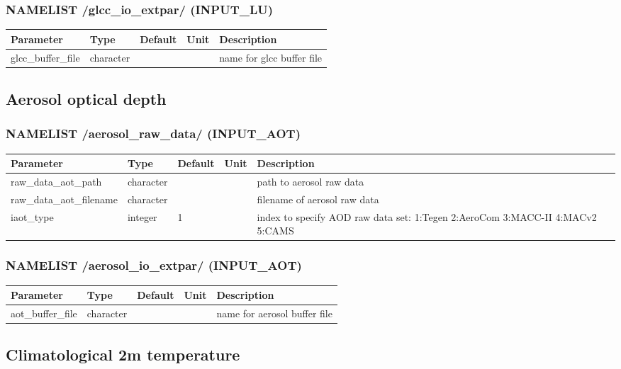 \documentclass[a4paper,10pt,DIV14,BCOR1cm,titlepage,twoside]{scrartcl}
\providecommand{\tabularnewline}{\\}
\begin{document}
\subsubsection*{NAMELIST /glcc\_io\_extpar/ (INPUT\_LU)}
\begin{longtable}{|p{4cm}|p{1.5cm}|p{1.5cm}|p{1cm}|p{6cm}|}
\hline 
\textbf{Parameter}& \textbf{Type}& \textbf{Default}& \textbf{Unit}& \textbf{Description}
\tabularnewline
\hline
\endhead
\hline
glcc\_buffer\_file & character & &  & name for glcc buffer file
\tabularnewline
\bottomrule
\end{longtable}

\subsection{Aerosol optical depth}\label{namelist_input_for_extpar_aot}

\subsubsection*{NAMELIST /aerosol\_raw\_data/ (INPUT\_AOT)}

\begin{longtable}{|p{4cm}|p{1.5cm}|p{1.5cm}|p{1cm}|p{6cm}|}
\hline 
\textbf{Parameter}& \textbf{Type}& \textbf{Default}& \textbf{Unit}& \textbf{Description}
\tabularnewline
\hline
\endhead
\hline 
raw\_data\_aot\_path & character & &  & path to aerosol raw data \tabularnewline
\hline 
raw\_data\_aot\_filename & character & &  & filename of aerosol raw data \tabularnewline
\hline 
iaot\_type & integer &1 &  & index to specify AOD raw data set: 1:Tegen 2:AeroCom 3:MACC-II 4:MACv2 5:CAMS \tabularnewline
\hline
\bottomrule
\end{longtable}

\subsubsection*{NAMELIST /aerosol\_io\_extpar/ (INPUT\_AOT)}
\begin{longtable}{|p{4cm}|p{1.5cm}|p{1.5cm}|p{1cm}|p{6cm}|}
\hline 
\textbf{Parameter}& \textbf{Type}& \textbf{Default}& \textbf{Unit}& \textbf{Descriptio}n
\tabularnewline
\hline
\endhead
\hline
aot\_buffer\_file & character & &  & name for aerosol buffer file
\tabularnewline
\hline
\bottomrule
\end{longtable}

\subsection{Climatological 2m temperature}\label{namelist_input_for_extpar_cru}
\end{document}

